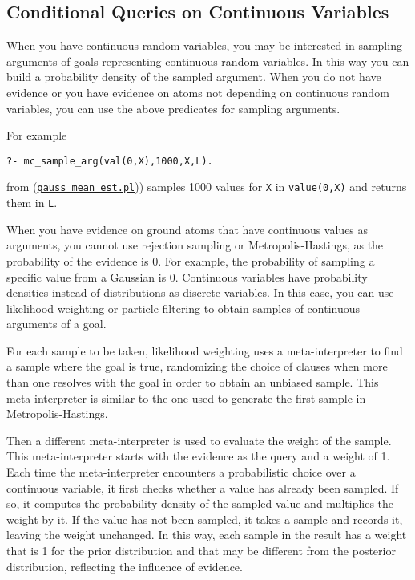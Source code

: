 \subsection{Conditional Queries on Continuous Variables}
\label{condqcont}

When you have continuous random variables, you may be interested in
sampling arguments of goals representing continuous random variables.
In this way you can build a probability density of the sampled argument.
When you do not have evidence or you have evidence on atoms not depending
on continuous random variables, you can use the above predicates for sampling
arguments.

For example
\begin{verbatim}
?- mc_sample_arg(val(0,X),1000,X,L).
\end{verbatim}
from (\href{http://cplint.eu/example/inference/gauss_mean_est.pl}{\texttt{gauss\_mean\_est.pl}})) samples 1000 values for \verb|X| in
\verb|value(0,X)| and returns them in \verb|L|.

When you have evidence on ground atoms that have continuous values as
arguments, you cannot use rejection sampling or Metropolis-Hastings,
as the probability of the evidence is 0. For example,
the probability of sampling a specific value from a Gaussian is 0.
Continuous variables have probability densities instead of distributions as
discrete variables.
In this case, you can use likelihood weighting or particle filtering \cite{fung1990weighing,koller2009probabilistic,Nitti2016} to obtain samples of
continuous arguments of a goal.

For each sample to be taken, likelihood weighting
uses a meta-interpreter to find a sample where
the goal is true, randomizing the choice of
clauses when more than one resolves with the goal
in order to obtain an unbiased sample.
This meta-interpreter is similar to the one used
to generate the first sample in Metropolis-Hastings.

Then a different meta-interpreter is used to evaluate
the weight of the sample.
This meta-interpreter starts with the evidence as the query and a weight of 1. Each time the meta-interpreter encounters
a probabilistic choice over a continuous variable, it first checks whether a
value has already been sampled.
If so, it computes the probability density of the sampled value and multiplies the weight by it. If the value has not been sampled, it takes a sample and records it,
leaving the weight unchanged.
In this way, each sample in the result has a weight that is 1 for the prior distribution and that may be different from the posterior distribution,
reflecting the influence of evidence.

